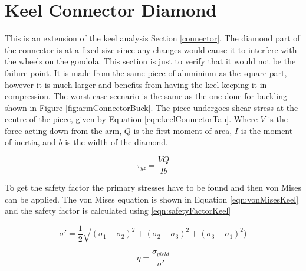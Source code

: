 \documentclass[../main.tex]{subfiles}
\begin{document}
\section{Keel Connector Diamond}
This is an extension of the keel analysis Section \ref{connector}. The diamond part of the connector is at a fixed size since any changes would cause it to interfere with the wheels on the gondola. This section is just to verify that it would not be the failure point. It is made from the same piece of aluminium as the square part, however it is much larger and benefits from having the keel keeping it in compression. The worst case scenario is the same as the one done for buckling shown in Figure \ref{fig:armConnectorBuck}. The piece undergoes shear stress at the centre of the piece, given by Equation \ref{eqn:keelConnectorTau}. Where $V$ is the force acting down from the arm, $Q$ is the first moment of area, $I$ is the moment of inertia, and $b$ is the width of the diamond.

\begin{equation} \label{eqn:keelConnectorTau}
\tau_{yz} = \frac{VQ}{Ib}
\end{equation}

To get the safety factor the primary stresses have to be found and then von Mises \cite[216]{shigley} can be applied. The von Mises equation is shown in Equation \ref{eqn:vonMisesKeel} and the safety factor is calculated using \ref{eqn:safetyFactorKeel}

\begin{equation} \label{eqn:vonMisesKeel}
\sigma' = \frac{1}{2}\sqrt{(\sigma_1 - \sigma_2)^2 + (\sigma_2 - \sigma_3)^2 + (\sigma_3 - \sigma_1)^2)}
\end{equation}

\begin{equation} \label{eqn:safetyFactorKeel}
\eta = \frac{\sigma_{yield}}{\sigma'}
\end{equation}
\end{document}
